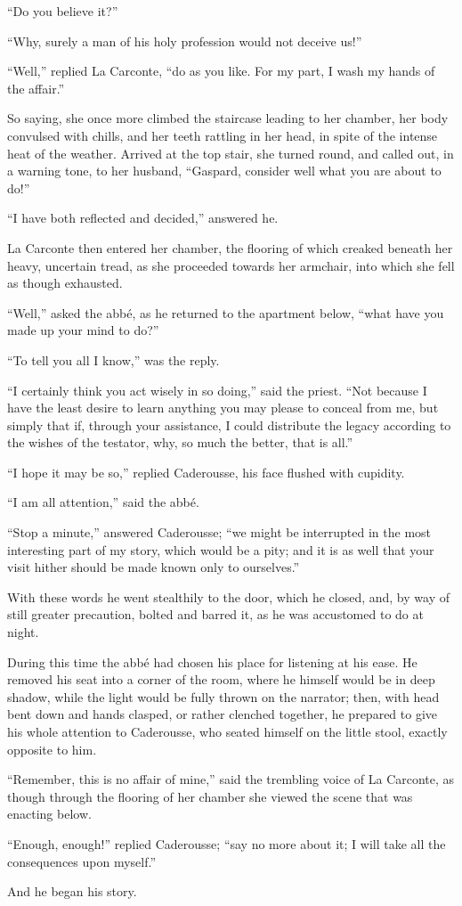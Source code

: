 “Do you believe it?”

“Why, surely a man of his holy profession would not deceive us!”

“Well,” replied La Carconte, “do as you like. For my part, I wash my
hands of the affair.”

So saying, she once more climbed the staircase leading to her chamber,
her body convulsed with chills, and her teeth rattling in her head, in
spite of the intense heat of the weather. Arrived at the top stair, she
turned round, and called out, in a warning tone, to her husband,
“Gaspard, consider well what you are about to do!”

“I have both reflected and decided,” answered he.

La Carconte then entered her chamber, the flooring of which creaked
beneath her heavy, uncertain tread, as she proceeded towards her
armchair, into which she fell as though exhausted.

“Well,” asked the abbé, as he returned to the apartment below, “what
have you made up your mind to do?”

“To tell you all I know,” was the reply.

“I certainly think you act wisely in so doing,” said the priest. “Not
because I have the least desire to learn anything you may please to
conceal from me, but simply that if, through your assistance, I could
distribute the legacy according to the wishes of the testator, why, so
much the better, that is all.”

“I hope it may be so,” replied Caderousse, his face flushed with
cupidity.

“I am all attention,” said the abbé.

“Stop a minute,” answered Caderousse; “we might be interrupted in the
most interesting part of my story, which would be a pity; and it is as
well that your visit hither should be made known only to ourselves.”

With these words he went stealthily to the door, which he closed, and,
by way of still greater precaution, bolted and barred it, as he was
accustomed to do at night.

During this time the abbé had chosen his place for listening at his
ease. He removed his seat into a corner of the room, where he himself
would be in deep shadow, while the light would be fully thrown on the
narrator; then, with head bent down and hands clasped, or rather
clenched together, he prepared to give his whole attention to
Caderousse, who seated himself on the little stool, exactly opposite to
him.

“Remember, this is no affair of mine,” said the trembling voice of La
Carconte, as though through the flooring of her chamber she viewed the
scene that was enacting below.

“Enough, enough!” replied Caderousse; “say no more about it; I will
take all the consequences upon myself.”

And he began his story.
